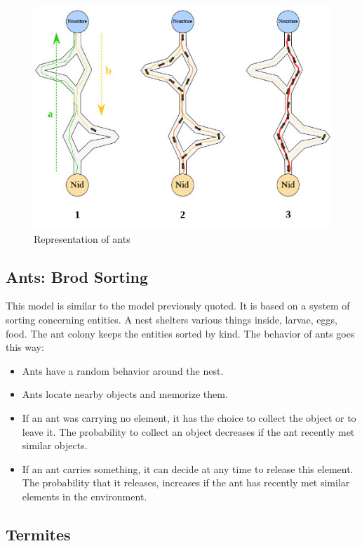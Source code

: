 \begin{figure}[h]
\center
\includegraphics{../images/SchemaFourmi.png}
\caption{\label{AntsRepresentation} Representation of ants\cite{RepresentationOfAnts}}
\end{figure}

\newpage

\subsection{Ants: Brod Sorting}

This model is similar to the model previously quoted. It is based on a system of sorting concerning entities. A nest shelters various things inside, larvae, eggs, food. The ant colony keeps the entities sorted by kind.
The behavior of ants goes this way:

\begin{itemize}
\item Ants have a random behavior around the nest.
\item Ants locate nearby objects and memorize them.
\item If an ant was carrying no element, it has the choice to collect the object or to leave it. The probability to collect an object decreases if the ant recently met similar objects.
\item If an ant carries something, it can decide at any time to release this element. The probability that it releases, increases if the ant has recently met similar elements in the environment.
\end{itemize}

\subsection{Termites}

